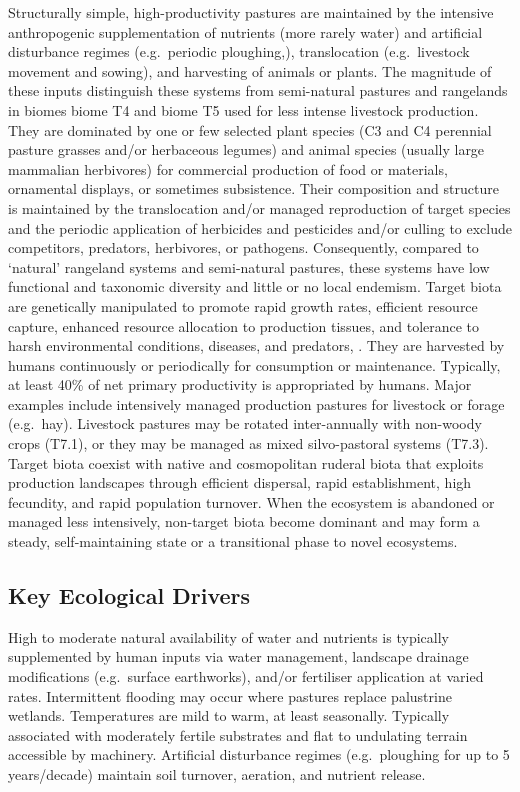 \documentclass[
  letterpaper,
  DIV=11,
  numbers=noendperiod]{scrartcl}
\begin{document}
Structurally simple, high-productivity pastures are maintained by the
intensive anthropogenic supplementation of nutrients (more rarely water)
and artificial disturbance regimes (e.g.~periodic ploughing,),
translocation (e.g.~livestock movement and sowing), and harvesting of
animals or plants. The magnitude of these inputs distinguish these
systems from semi-natural pastures and rangelands in biomes biome T4 and
biome T5 used for less intense livestock production. They are dominated
by one or few selected plant species (C3 and C4 perennial pasture
grasses and/or herbaceous legumes) and animal species (usually large
mammalian herbivores) for commercial production of food or materials,
ornamental displays, or sometimes subsistence. Their composition and
structure is maintained by the translocation and/or managed reproduction
of target species and the periodic application of herbicides and
pesticides and/or culling to exclude competitors, predators, herbivores,
or pathogens. Consequently, compared to `natural' rangeland systems and
semi-natural pastures, these systems have low functional and taxonomic
diversity and little or no local endemism. Target biota are genetically
manipulated to promote rapid growth rates, efficient resource capture,
enhanced resource allocation to production tissues, and tolerance to
harsh environmental conditions, diseases, and predators, . They are
harvested by humans continuously or periodically for consumption or
maintenance. Typically, at least 40\% of net primary productivity is
appropriated by humans. Major examples include intensively managed
production pastures for livestock or forage (e.g.~hay). Livestock
pastures may be rotated inter-annually with non-woody crops (T7.1), or
they may be managed as mixed silvo-pastoral systems (T7.3). Target biota
coexist with native and cosmopolitan ruderal biota that exploits
production landscapes through efficient dispersal, rapid establishment,
high fecundity, and rapid population turnover. When the ecosystem is
abandoned or managed less intensively, non-target biota become dominant
and may form a steady, self-maintaining state or a transitional phase to
novel ecosystems.

\subsection{Key Ecological Drivers}\label{key-ecological-drivers-99}

High to moderate natural availability of water and nutrients is
typically supplemented by human inputs via water management, landscape
drainage modifications (e.g.~surface earthworks), and/or fertiliser
application at varied rates. Intermittent flooding may occur where
pastures replace palustrine wetlands. Temperatures are mild to warm, at
least seasonally. Typically associated with moderately fertile
substrates and flat to undulating terrain accessible by machinery.
Artificial disturbance regimes (e.g.~ploughing for up to 5 years/decade)
maintain soil turnover, aeration, and nutrient release.
\end{document}
